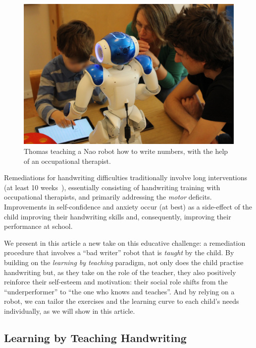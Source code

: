 \documentclass{article}
\begin{document}
\begin{figure}
    \centering
    \includegraphics[width=0.9\linewidth]{henry}
    \caption{\small Thomas teaching a {\sc Nao} robot how to write numbers, with 
    the help of an occupational therapist.}
    \label{fig:henry}
\end{figure}

Remediations for handwriting difficulties traditionally involve long
interventions (at least 10 weeks~\cite{Hoy2011}), essentially consisting of
handwriting training with occupational therapists, and primarily addressing the
\emph{motor} deficits.  Improvements in self-confidence and anxiety occur (at
best) as a side-effect of the child improving their handwriting skills and,
consequently, improving their performance at school.

We present in this article a new take on this educative challenge: a remediation
procedure that involves a ``bad writer'' robot that is \emph{taught} by the
child. By building on the \emph{learning by teaching} paradigm, not only does the
child practise handwriting but, as they take on the role of the teacher, they
also positively reinforce their self-esteem and motivation: their social role
shifts from the ``underperformer'' to ``the one who knows and teaches''. And by
relying on a robot, we can tailor the exercises and the learning curve to each
child's needs individually, as we will show in this article.

\subsection{Learning by Teaching Handwriting}
\end{document}
